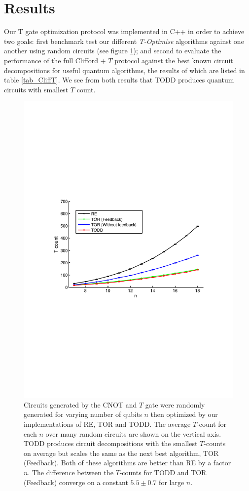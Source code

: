 \documentclass[titlepage]{article}
\theoremstyle{definition}
\theoremstyle{problem}
\theoremstyle{lemma}
\begin{document}
		

	\FloatBarrier
	
	\section{Results}
	\label{sec_results}
	Our T gate optimization protocol was implemented in C++ in order to achieve two goals: first benchmark test our different \emph{T-Optimise} algorithms against one another using random circuits (see figure \ref{fig_random}); and second to evaluate the performance of the full Clifford + $T$ protocol against the best known circuit decompositions for useful quantum algorithms, the results of which are listed in table \ref{tab_CliffT}. We see from both results that TODD produces quantum circuits with smallest $T$ count.
	
	\begin{figure}[h!]
		\centering
		\includegraphics[width=0.5\linewidth, trim={3cm 10cm 3cm 9.5cm},clip]{random_benchmark}
		\caption{Circuits generated by the $\mathrm{CNOT}$ and $T$ gate were randomly generated for varying number of qubits $n$ then optimized by our implementations of RE, TOR and TODD. The average $T$-count for each $n$ over many random circuits are shown on the vertical axis. TODD produces circuit decompositions with the smallest $T$-counts on average but scales the same as the next best algorithm, TOR (Feedback). Both of these algorithms are better than RE by a factor $n$. The difference between the $T$-counts for TODD and TOR (Feedback) converge on a constant $5.5\pm 0.7$ for large $n$. 
		}
		\label{fig_random}
	\end{figure}
\end{document}
